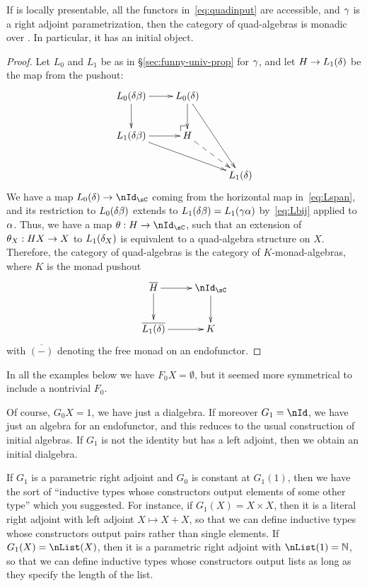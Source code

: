 \documentclass{amsart}
\begin{document}
\begin{thm}\label{thm:quadalg}
  If \sC is locally presentable, all the functors in~\eqref{eq:quadinput} are accessible, and $\gamma$ is a right adjoint parametrization, then the category of quad-algebras is monadic over \sC.
  In particular, it has an initial object.
\end{thm}
\begin{proof}
  Let $L_0$ and $L_1$ be as in \S\ref{sec:funny-univ-prop} for $\gamma$, and let $H \to L_1(\delta)$ be the map from the pushout:
  \begin{equation}
    \vcenter{\xymatrix{
        L_0(\de\be)\ar[r]\ar[d] &
        L_0(\de)\ar[d] \ar[ddr]\\
        L_1(\de\be)\ar[r] \ar[drr] &
        H \pushoutcorner \ar@{-->}[dr]\\
        && L_1(\de)
      }}
  \end{equation}
  We have a map $L_0(\de) \to \nId_\sC$ coming from the horizontal map in~\eqref{eq:Lspan}, and its restriction to $L_0(\delta\beta)$ extends to $L_1(\delta\beta) = L_1(\gamma\alpha)$ by~\eqref{eq:Lbij} applied to $\alpha$.
  Thus, we have a map $\th:H\to \nId_\sC$, such that an extension of $\theta_X:HX \to X$ to $L_1(\delta_X)$ is equivalent to a quad-algebra structure on $X$.
  Therefore, the category of quad-algebras is the category of $K$-monad-algebras, where $K$ is the monad pushout
  \begin{equation}
  \vcenter{\xymatrix{
      \overline{H}\ar[r]\ar[d] &
      \nId_\sC\ar[d]\\
      \overline{L_1(\de)}\ar[r] &
      K
      }}
  \end{equation}
  with $\overline{(-)}$ denoting the free monad on an endofunctor.
\end{proof}

In all the examples below we have $F_0X=\emptyset$, but it seemed more symmetrical to include a nontrivial $F_0$.

\begin{eg}
  Of course, $G_0X=1$, we have just a dialgebra.
  If moreover $G_1=\nId$, we have just an algebra for an endofunctor, and this reduces to the usual construction of initial algebras.
  If $G_1$ is not the identity but has a left adjoint, then we obtain an initial dialgebra.
\end{eg}

\begin{eg}
  If $G_1$ is a parametric right adjoint and $G_0$ is constant at $G_1(1)$, then we have the sort of ``inductive types whose constructors output elements of some other type'' which you suggested.
  For instance, if $G_1(X) = X\times X$, then it is a literal right adjoint with left adjoint $X\mapsto X+X$, so that we can define inductive types whose constructors output pairs rather than single elements.
  If $G_1(X) = \nList(X)$, then it is a parametric right adjoint with $\nList(1)=\mathbb{N}$, so that we can define inductive types whose constructors output lists as long as they specify the length of the list.
\end{eg}
\end{document}
